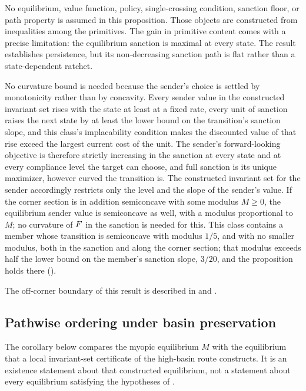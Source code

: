No equilibrium, value function, policy, single-crossing condition,
sanction floor, or path property is assumed in this proposition. Those
objects are constructed from inequalities among the primitives. The
gain in primitive content comes with a precise limitation: the
equilibrium sanction is maximal at every state. The result establishes
persistence, but its non-decreasing sanction path is flat rather than a
state-dependent ratchet.

No curvature bound is needed because the sender's choice is settled by
monotonicity rather than by concavity. Every sender value in the constructed
invariant set rises with the state at least at a fixed rate, every unit of sanction
raises the next state by at least the lower bound on the transition's sanction slope, and this class's
implacability condition makes the discounted value of that rise exceed the largest
current cost of the unit. The sender's forward-looking objective is therefore
strictly increasing in the sanction at every state and at every compliance level
the target can choose, and full sanction is its unique maximizer, however
curved the transition is. The constructed invariant set for the sender accordingly restricts only
the level and the slope of the sender's value. If the corner section is in
addition semiconcave with some modulus $M\ge0$, the equilibrium sender value is
semiconcave as well, with a modulus proportional to $M$; no curvature of $F$ in
the sanction is needed for this. This class contains a member whose transition is
semiconcave with modulus $1/5$, and with no smaller modulus, both in the
sanction and along the corner section; that modulus exceeds half the lower bound on the member's
sanction slope, $3/20$,
and the proposition holds there ().

The off-corner boundary of this result is described in 
and .

\subsection{Pathwise ordering under basin preservation}
\label{app:persistence:pathwise}

The corollary below compares the myopic equilibrium $M$ with the equilibrium that a
local invariant-set certificate of the high-basin route constructs. It is an
existence statement about that constructed equilibrium, not a statement about
every equilibrium satisfying the hypotheses of .

